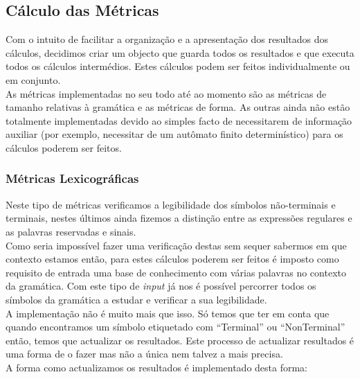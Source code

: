 \documentclass[a4paper,11pt]{article}
\begin{document}
\vspace{0.5cm}
\subsection{\large Cálculo das Métricas}

Com o intuito de facilitar a organização e a apresentação dos resultados dos cálculos, decidimos criar um objecto que guarda todos os resultados e que executa todos os cálculos intermédios. Estes cálculos podem ser feitos individualmente ou em conjunto.\\
\newline
As métricas implementadas no seu todo até ao momento são as métricas de tamanho relativas à gramática e as métricas de forma. As outras ainda não estão totalmente implementadas devido ao simples facto de necessitarem de informação auxiliar (por exemplo, necessitar de um autômato finito determinístico) para os cálculos poderem ser feitos.\\

\subsubsection{Métricas Lexicográficas}

Neste tipo de métricas verificamos a legibilidade dos símbolos não-terminais e terminais, nestes últimos ainda fizemos a distinção entre as expressões regulares e as palavras reservadas e sinais.\\
\newline
Como seria impossível fazer uma verificação destas sem sequer sabermos em que contexto estamos então, para estes cálculos poderem ser feitos é imposto como requisito de entrada uma base de conhecimento com várias palavras no contexto da gramática. Com este tipo de {\em input} já nos é possível percorrer todos os símbolos da gramática a estudar e verificar a sua legibilidade.\\
\newline
A implementação não é muito mais que isso. Só temos que ter em conta que quando encontramos um símbolo etiquetado com ``Terminal'' ou ``NonTerminal'' então, temos que actualizar os resultados. Este processo de actualizar resultados é uma forma de o fazer mas não a única nem talvez a mais precisa.\\
\newline
A forma como actualizamos os resultados é implementado desta forma:
\end{document}
